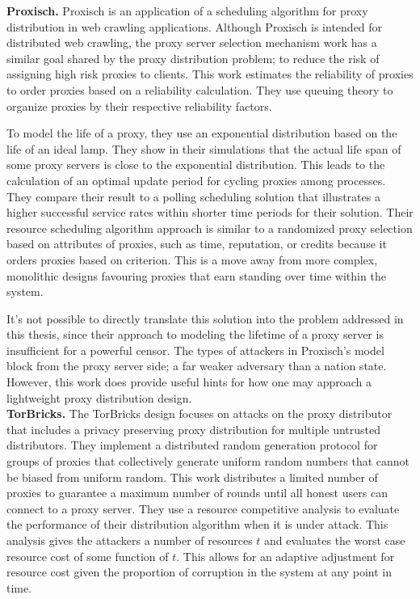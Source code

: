 \textbf{Proxisch.} Proxisch \cite{jiang2016proxisch} is an application of a scheduling algorithm for proxy distribution in web crawling applications. Although Proxisch is intended for distributed web crawling, the proxy server selection mechanism work has a similar goal shared by the proxy distribution problem; to reduce the risk of assigning high risk proxies to clients. This work estimates the reliability of proxies to order proxies based on a reliability calculation. They use queuing theory to organize proxies by their respective reliability factors. 

To model the life of a proxy, they use an exponential distribution based on the life of an ideal lamp. They show in their simulations that the actual life span of some proxy servers is close to the exponential distribution. This leads to the calculation of an optimal update period for cycling proxies among processes. They compare their result to a polling scheduling solution that illustrates a higher successful service rates within shorter time periods for their solution. Their resource scheduling algorithm approach is similar to a randomized proxy selection based on attributes of proxies, such as time, reputation, or credits because it orders proxies based on criterion. This is a move away from more complex, monolithic designs favouring proxies that earn standing over time within the system. 

It's not possible to directly translate this solution into the problem addressed in this thesis, since their approach to modeling the lifetime of a proxy server is insufficient for a powerful censor. The types of attackers in Proxisch's model block from the proxy server side; a far weaker adversary than a nation state. However, this work does provide useful hints for how one may approach a lightweight proxy distribution design.\\

\textbf{TorBricks.} The TorBricks \cite{zamani2017torbricks} design focuses on attacks on the proxy distributor that includes a privacy preserving proxy distribution for multiple untrusted distributors. They implement a distributed random generation protocol for groups of proxies that collectively generate uniform random numbers that cannot be biased from uniform random. This work distributes a limited number of proxies to guarantee a maximum number of rounds until all honest users can connect to a proxy server. They use a resource competitive analysis to evaluate the performance of their distribution algorithm when it is under attack. This analysis gives the attackers a number of resources $t$ and evaluates the worst case resource cost of some function of $t$. This allows for an adaptive adjustment for resource cost given the proportion of corruption in the system at any point in time. 


